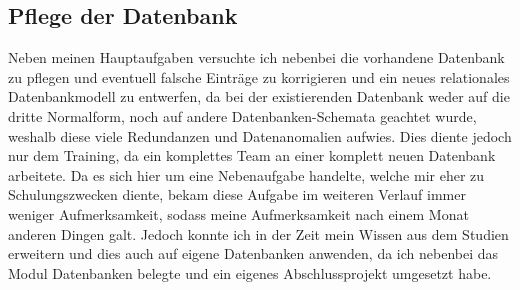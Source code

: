 \subsection{Pflege der Datenbank}
\label{sec:Pflege der Datenbank}

Neben meinen Hauptaufgaben versuchte ich nebenbei die vorhandene Datenbank zu pflegen und eventuell falsche Einträge zu korrigieren und ein neues relationales Datenbankmodell zu entwerfen, da bei der existierenden Datenbank weder auf die dritte Normalform, noch auf andere Datenbanken-Schemata geachtet wurde, weshalb diese viele Redundanzen und Datenanomalien aufwies. Dies diente jedoch nur dem Training, da ein komplettes Team an einer komplett neuen Datenbank arbeitete. Da es sich hier um eine Nebenaufgabe handelte, welche mir eher zu Schulungszwecken diente, bekam diese Aufgabe im weiteren Verlauf immer weniger Aufmerksamkeit, sodass meine Aufmerksamkeit nach einem Monat anderen Dingen galt. Jedoch konnte ich in der Zeit mein Wissen aus dem Studien erweitern und dies auch auf eigene Datenbanken anwenden, da ich nebenbei das Modul Datenbanken belegte und ein eigenes Abschlussprojekt umgesetzt habe. 